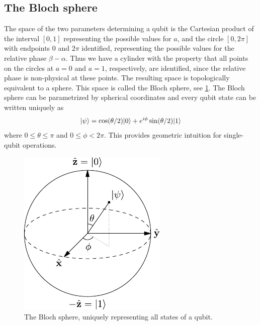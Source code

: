 \documentclass[a4paper,10pt,oneside]{book}
\theoremstyle{plain}
\theoremstyle{definition}
\theoremstyle{remark}
\DeclarePairedDelimiter\ket{\lvert}{\rangle}
\begin{document}
\subsection{The Bloch sphere} The space of the two parameters determining a qubit is the Cartesian product of the interval $[0,1]$ representing the possible values for $a$, and the circle $[0,2\pi]$ with endpoints $0$ and $2\pi$ identified, representing the possible values for the relative phase $\beta - \alpha$. Thus we have a cylinder with the property that all points on the circles at $a = 0$ and $a = 1$, respectively, are identified, since the relative phase is non-physical at these points. The resulting space is topologically equivalent to a sphere. This space is called the Bloch sphere, see \cref{fig:bloch sphere}. The Bloch sphere can be parametrized by spherical coordinates and every qubit state can be written uniquely as
\begin{equation}
  \ket{\psi} = \cos(\theta/2) \ket{0} + e^{i\phi}\sin(\theta/2) \ket{1}
\end{equation}
where $0 \le \theta \le \pi$ and $0 \le \phi < 2\pi$. This provides geometric intuition for single-qubit operations.

\begin{figure}[!htb]
  \centering
  \includegraphics{img/bloch-sphere.pdf}
  \caption{The Bloch sphere, uniquely representing all states of a qubit.}
  \label{fig:bloch sphere}
\end{figure}
\end{document}
